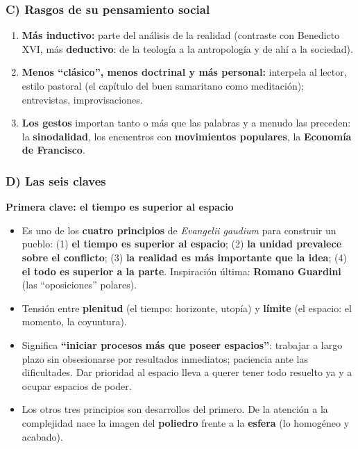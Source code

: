 \documentclass[10pt,a4paper]{article}
\begin{document}
\subsubsection{C) Rasgos de su pensamiento social}
\begin{enumerate}
\item \textbf{Más inductivo:} parte del análisis de la realidad (contraste con Benedicto XVI, más \textbf{deductivo}: de la teología a la antropología y de ahí a la sociedad).
\item \textbf{Menos ``clásico'', menos doctrinal y más personal:} interpela al lector, estilo pastoral (el capítulo del buen samaritano como meditación); entrevistas, improvisaciones.
\item \textbf{Los gestos} importan tanto o más que las palabras y a menudo las preceden: la \textbf{sinodalidad}, los encuentros con \textbf{movimientos populares}, la \textbf{Economía de Francisco}.
\end{enumerate}

\subsubsection{D) Las seis claves}

\medskip\noindent \textbf{Primera clave: el tiempo es superior al espacio}\par\nopagebreak
\begin{itemize}
\item Es uno de los \textbf{cuatro principios} de \textit{Evangelii gaudium} para construir un pueblo: (1) \textbf{el tiempo es superior al espacio}; (2) \textbf{la unidad prevalece sobre el conflicto}; (3) \textbf{la realidad es más importante que la idea}; (4) \textbf{el todo es superior a la parte}. Inspiración última: \textbf{Romano Guardini} (las ``oposiciones'' polares).
\item Tensión entre \textbf{plenitud} (el tiempo: horizonte, utopía) y \textbf{límite} (el espacio: el momento, la coyuntura).
\item Significa \textbf{``iniciar procesos más que poseer espacios''}: trabajar a largo plazo sin obsesionarse por resultados inmediatos; paciencia ante las dificultades. Dar prioridad al espacio lleva a querer tener todo resuelto ya y a ocupar espacios de poder.
\item Los otros tres principios son desarrollos del primero. De la atención a la complejidad nace la imagen del \textbf{poliedro} frente a la \textbf{esfera} (lo homogéneo y acabado).
\end{itemize}
\end{document}
